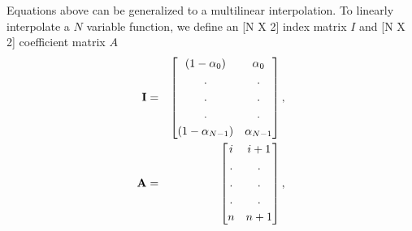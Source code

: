 \documentclass[a4paper, 12 pt, fleqn]{article}
\begin{document}
Equations above can be generalized to a multilinear interpolation. To linearly interpolate a $N$ variable function, we define an [N X 2] index matrix $I$ and [N X 2] coefficient matrix $A$
\begin{eqnarray}
\bold{I} &=& \begin{bmatrix}
       (1-\alpha_0) & \alpha_0           \\[0.3em]
       . & .   \\[0.3em]
       . & .   \\[0.3em]
       . & .   \\[0.3em]
       (1-\alpha_{N-1}) & \alpha_{N-1} \\         
     \end{bmatrix}, \\
     \bold{A} &=& \begin{bmatrix}
       i & i+1            \\[0.3em]
       . & .   \\[0.3em]
       . & .   \\[0.3em]
       . & .   \\[0.3em]
       n & n+1
       \end{bmatrix}, \\
\end{eqnarray}
\end{document}
